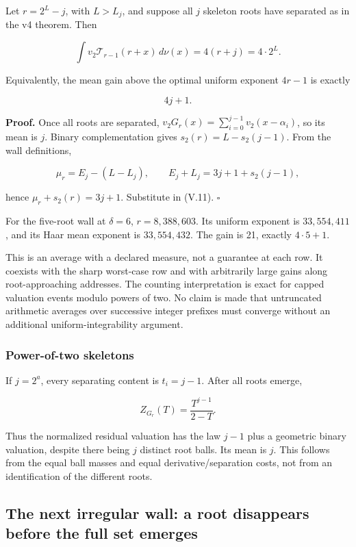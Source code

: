 \documentclass[11pt,letterpaper]{article}
\begin{document}
Let \(r=2^L-j\), with \(L>L_j\), and suppose all \(j\) skeleton roots have separated as in the v4 theorem. Then

\[
\boxed{
\int v_2\mathcal T_{r-1}(r+x)\,d\nu(x)
=4(r+j)=4\cdot2^L.
} \tag{V.13}
\]

Equivalently, the mean gain above the optimal uniform exponent \(4r-1\) is exactly

\[
\boxed{4j+1.}
\]

\textbf{Proof.} Once all roots are separated, \(v_2G_r(x)=\sum_{i=0}^{j-1}v_2(x-\alpha_i)\), so its mean is \(j\). Binary complementation gives \(s_2(r)=L-s_2(j-1)\). From the wall definitions,

\[
\mu_r=E_j-(L-L_j),\qquad
E_j+L_j=3j+1+s_2(j-1),
\]

hence \(\mu_r+s_2(r)=3j+1\). Substitute in (V.11). \(\square\)

For the five-root wall at \(\delta=6\), \(r=8{,}388{,}603\). Its uniform exponent is \(33{,}554{,}411\), and its Haar mean exponent is \(33{,}554{,}432\). The gain is 21, exactly \(4\cdot5+1\).

This is an average with a declared measure, not a guarantee at each row. It coexists with the sharp worst-case row and with arbitrarily large gains along root-approaching addresses. The counting interpretation is exact for capped valuation events modulo powers of two. No claim is made that untruncated arithmetic averages over successive integer prefixes must converge without an additional uniform-integrability argument.

\subsubsection{Power-of-two skeletons}\label{power-of-two-skeletons}

If \(j=2^a\), every separating content is \(t_i=j-1\). After all roots emerge,

\[
\boxed{
Z_{G_r}(T)=\frac{T^{j-1}}{2-T}.
} \tag{V.14}
\]

Thus the normalized residual valuation has the law \(j-1\) plus a geometric binary valuation, despite there being \(j\) distinct root balls. Its mean is \(j\). This follows from the equal ball masses and equal derivative/separation costs, not from an identification of the different roots.

\subsection{The next irregular wall: a root disappears before the full set emerges}\label{the-next-irregular-wall-a-root-disappears-before-the-full-set-emerges}
\end{document}
